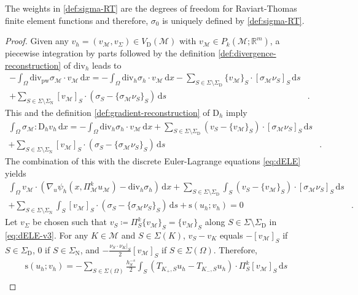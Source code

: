 \documentclass[a4paper]{amsart}
\numberwithin{equation}{section}
\newcommand{\R}{\mathbb{R}}
\renewcommand{\d}[1]{\,\mathrm{d}#1}
\renewcommand{\div}{\mathrm{div}}
\newcommand{\Mcal}{\mathcal{M}}
\newcommand{\pw}{\mathrm{pw}}
\newcommand{\D}{\mathrm{D}}
\newcommand{\s}{\mathrm{s}}
\theoremstyle{remark}
\begin{document}
The weights in \eqref{def:sigma-RT} are the degrees of freedom for Raviart-Thomas finite element functions \cite[Section 14.3]{ErnGuermond2021} and therefore, $\sigma_0$ is uniquely defined by \eqref{def:sigma-RT}.
\begin{proof}
	Given any $v_h = (v_\Mcal, v_\Sigma) \in V_\mathrm{D}(\Mcal)$ with $v_\Mcal \in P_k(\Mcal;\R^m)$, a piecewise integration by parts followed by the definition \eqref{def:divergence-reconstruction} of $\div_h$ leads to
	\begin{align*}
		- \int_\Omega \div_\pw \sigma_\Mcal \cdot v_\Mcal \d{x} = -\int_\Omega \div_h \sigma_h \cdot v_\Mcal \d{x} - \sum_{S \in \Sigma\setminus\Sigma_\mathrm{D}} \{v_\Mcal\}_S \cdot [\sigma_\Mcal \nu_S]_S \d{s}&\\
		+ \sum_{S \in \Sigma\setminus\Sigma_\mathrm{N}} [v_\Mcal]_S \cdot (\sigma_S - \{\sigma_\Mcal \nu_S\}_S) \d{s}&.
	\end{align*}
	This and the definition \eqref{def:gradient-reconstruction} of $\D_h$ imply
	\begin{align*}
		\int_\Omega \sigma_\Mcal : \D_h v_h \d{x} = - \int_\Omega \div_h \sigma_h \cdot v_\Mcal \d{x} + \sum_{S \in \Sigma\setminus\Sigma_\mathrm{D}} (v_S - \{v_\Mcal\}_S) \cdot [\sigma_\Mcal \nu_S]_S \d{s}&\\
		+ \sum_{S \in \Sigma\setminus\Sigma_\mathrm{N}} [v_\Mcal]_S \cdot (\sigma_S - \{\sigma_\Mcal \nu_S\}_S) \d{s}&.
	\end{align*}
	The combination of this with the discrete Euler-Lagrange equations \eqref{eq:dELE} yields
	\begin{align}
		\int_\Omega v_\Mcal \cdot (\nabla_u \psi_h(x, \Pi_\Mcal^k u_\Mcal) - \div_h \sigma_h) \d{x}
		+ \sum_{S \in \Sigma\setminus\Sigma_\mathrm{D}} \int_S (v_S - \{v_\Mcal\}_S) \cdot [\sigma_\Mcal \nu_S]_S \d{s}&\nonumber\\
		+ \sum_{S \in \Sigma\setminus\Sigma_\mathrm{N}} \int_S [v_\Mcal]_S \cdot (\sigma_S - \{\sigma_\Mcal \nu_S\}_S) \d{s} + \s(u_h; v_h) = 0&.
		\label{eq:dELE-v3}
	\end{align}
	Let $v_\Sigma$ be chosen such that $v_S \coloneqq \Pi_S^k\{v_\Mcal\}_S = \{v_\Mcal\}_S$ along $S \in \Sigma\setminus\Sigma_\mathrm{D}$ in \eqref{eq:dELE-v3}. For any $K \in \Mcal$ and $S \in \Sigma(K)$, $v_S - v_K$ equals $- [v_\Mcal]_S$ if $S \in \Sigma_\mathrm{D}$, $0$ if $S \in \Sigma_\mathrm{N}$, and $- \frac{\nu_S \cdot \nu_K|_S}{2} [v_\Mcal]_S$ if $S \in \Sigma(\Omega)$.
	Therefore,
	\begin{align*}
		\s(u_h;v_h) = - \sum_{S \in \Sigma(\Omega)} \frac{h_S^{-s}}{2} \int_S (T_{K_+,S} u_h - T_{K_-,S} u_h) \cdot \Pi_S^k[v_\Mcal]_S \d{s}&\\

\end{align*}
\end{proof}
\end{document}
